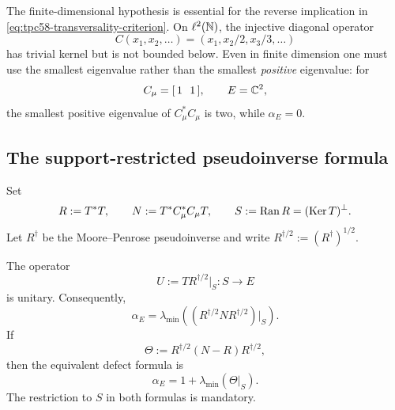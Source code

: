 The finite-dimensional hypothesis is essential for the reverse implication
in \eqref{eq:tpc58-transversality-criterion}.  On \(\ell^2(\mathbb N)\), the
injective diagonal operator
\begin{equation}
 C(x_1,x_2,\ldots)=(x_1,x_2/2,x_3/3,\ldots)
 \label{eq:tpc58-infinite-dimensional-counterexample}
\end{equation}
has trivial kernel but is not bounded below.  Even in finite dimension one
must use the smallest eigenvalue rather than the smallest \emph{positive}
eigenvalue: for
\begin{equation}
 C_\mu=[\,1\ \ 1\,],
 \qquad E=\mathbb C^2,
 \label{eq:tpc58-positive-eigenvalue-counterexample}
\end{equation}
the smallest positive eigenvalue of \(C_\mu^*C_\mu\) is two, while
\(\alpha_E=0\).

\subsection{The support-restricted pseudoinverse formula}

Set
\begin{equation}
 R:=T^*T,
 \qquad
 N:=T^*C_\mu^*C_\mu T,
 \qquad
 S:=\operatorname{Ran} R=(\operatorname{Ker} T)^\perp.
 \label{eq:tpc58-R-N-S}
\end{equation}
Let \(R^\dagger\) be the Moore--Penrose pseudoinverse and write
\(R^{\dagger/2}:=(R^\dagger)^{1/2}\).

\begin{theorem}
\label{thm:tpc58-range-normalized-gram}
The operator
\begin{equation}
 U:=T R^{\dagger/2}|_S:S\longrightarrow E
 \label{eq:tpc58-polar-unitary}
\end{equation}
is unitary.  Consequently,
\begin{equation}
 \boxed{
 \alpha_E
 =\lambda_{\min}\!\left(
   (R^{\dagger/2}NR^{\dagger/2})|_S\right).}
 \label{eq:tpc58-pseudoinverse-minimum}
\end{equation}
If
\begin{equation}
 \Theta
 :=R^{\dagger/2}(N-R)R^{\dagger/2},
 \label{eq:tpc58-relative-defect}
\end{equation}
then the equivalent defect formula is
\begin{equation}
 \boxed{
 \alpha_E
 =1+\lambda_{\min}(\Theta|_S).}
 \label{eq:tpc58-relative-defect-minimum}
\end{equation}
The restriction to \(S\) in both formulas is mandatory.
\end{theorem}

